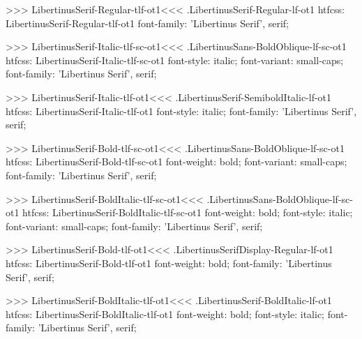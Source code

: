 {{{{>>>
\<LibertinusSerif-Regular-tlf-ot1\><<<
.LibertinusSerif-Regular-lf-ot1
htfcss:  LibertinusSerif-Regular-tlf-ot1  font-family: 'Libertinus Serif', serif;

>>>
\<LibertinusSerif-Italic-tlf-sc-ot1\><<<
.LibertinusSans-BoldOblique-lf-sc-ot1
htfcss:  LibertinusSerif-Italic-tlf-sc-ot1  font-style: italic; font-variant: small-caps; font-family: 'Libertinus Serif', serif;

>>>
\<LibertinusSerif-Italic-tlf-ot1\><<<
.LibertinusSerif-SemiboldItalic-lf-ot1
htfcss:  LibertinusSerif-Italic-tlf-ot1  font-style: italic; font-family: 'Libertinus Serif', serif;

>>>
\<LibertinusSerif-Bold-tlf-sc-ot1\><<<
.LibertinusSans-BoldOblique-lf-sc-ot1
htfcss:  LibertinusSerif-Bold-tlf-sc-ot1  font-weight: bold; font-variant: small-caps; font-family: 'Libertinus Serif', serif;

>>>
\<LibertinusSerif-BoldItalic-tlf-sc-ot1\><<<
.LibertinusSans-BoldOblique-lf-sc-ot1
htfcss:  LibertinusSerif-BoldItalic-tlf-sc-ot1  font-weight: bold; font-style: italic; font-variant: small-caps; font-family: 'Libertinus Serif', serif;

>>>
\<LibertinusSerif-Bold-tlf-ot1\><<<
.LibertinusSerifDisplay-Regular-lf-ot1
htfcss:  LibertinusSerif-Bold-tlf-ot1  font-weight: bold; font-family: 'Libertinus Serif', serif;

>>>
\<LibertinusSerif-BoldItalic-tlf-ot1\><<<
.LibertinusSerif-BoldItalic-lf-ot1
htfcss:  LibertinusSerif-BoldItalic-tlf-ot1  font-weight: bold; font-style: italic; font-family: 'Libertinus Serif', serif;

}}}}
